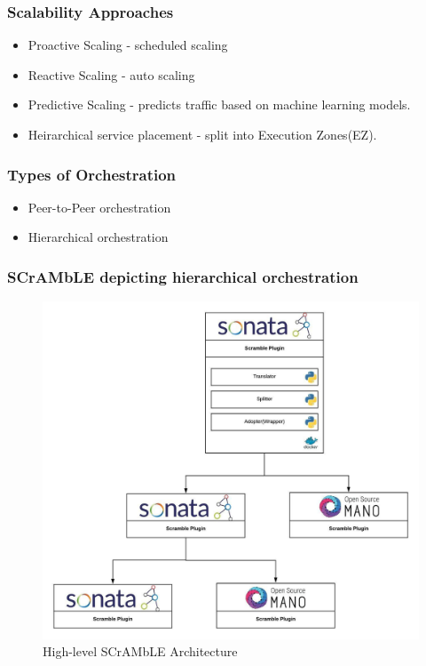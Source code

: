 \begin{frame}
\frametitle{Scalability Approaches}

\begin{itemize}
	
	\item Proactive Scaling - scheduled scaling
	\item Reactive Scaling - auto scaling
	\item Predictive Scaling - predicts traffic based on machine learning models.
	\item Heirarchical service placement - split into Execution Zones(EZ).
\end{itemize}   
\end{frame}

\begin{frame}
\frametitle{Types of Orchestration}

\begin{itemize}
\item Peer-to-Peer orchestration
\item Hierarchical orchestration
\end{itemize}

\end{frame}

\begin{frame}
\frametitle{SCrAMbLE depicting hierarchical orchestration}
\begin{figure}
	\centering
	\includegraphics[width=0.7\linewidth]{images/scramblearch}
	\caption{High-level SCrAMbLE Architecture }
	\label{fig:scramblearch}
\end{figure}

\end{frame}

